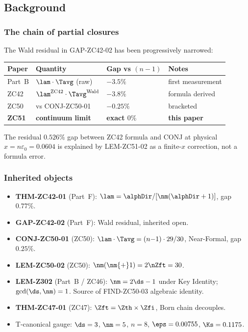 \documentclass[12pt, a4paper]{article}
\begin{document}
\subsection{Background}

\subsubsection{The chain of partial closures}

The Wald residual in GAP-ZC42-02 has been progressively narrowed:
\begin{center}
\begin{tabular}{@{}llll@{}}
\toprule
Paper & Quantity & Gap vs $(n-1)$ & Notes \\
\midrule
Part~B   & $\lam\cdot\Tavg$ (raw) & $-3.5\%$  & first measurement \\
ZC42     & $\lam^{\rm ZC42}\cdot\Tavg^{\rm Wald}$ & $-3.8\%$ & formula derived \\
ZC50     & vs CONJ-ZC50-01 & $-0.25\%$ & bracketed \\
\textbf{ZC51} & \textbf{continuum limit} & \textbf{exact $0\%$} & \textbf{this paper} \\
\bottomrule
\end{tabular}
\end{center}
The residual $0.526\%$ gap between ZC42 formula and CONJ at physical
$x = n\varepsilon_0 = 0.0604$ is explained by LEM-ZC51-02 as a
finite-$x$ correction, not a formula error.

\subsubsection{Inherited objects}

\begin{itemize}[leftmargin=2em]
\item \textbf{THM-ZC42-01} (Part~F): $\lam = \alphDir/[\nm(\alphDir+1)]$, gap $0.77\%$.
\item \textbf{GAP-ZC42-02} (Part~F): Wald residual, inherited open.
\item \textbf{CONJ-ZC50-01} (ZC50): $\lam\cdot\Tavg = (n{-}1)\cdot29/30$,
  Near-Formal, gap $0.25\%$.
\item \textbf{LEM-ZC50-02} (ZC50): $\nm(\nm{+}1) = 2\nZft = 30$.
\item \textbf{LEM-Z302} (Part~B / ZC46): $\nm = 2\ds - 1$ under Key Identity;
  $\gcd(\ds,\nm)=1$. Source of FIND-ZC50-03 algebraic identity.
\item \textbf{THM-ZC47-01} (ZC47): $\Zft = \Zth\times\Zfi$, Born chain decouples.
\item T-canonical gauge: $\ds=3$, $\nm=5$, $n=8$, $\eps=0.00755$, $\Ks=0.1175$.
\end{itemize}
\end{document}
